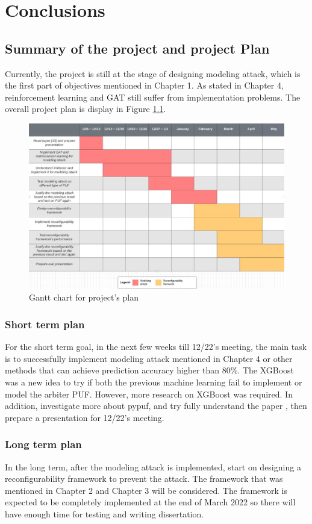 \chapter{Conclusions}

\section{Summary of the project and project Plan}
Currently, the project is still at the stage of designing modeling attack, which is the first part of objectives mentioned in Chapter 1. As stated in Chapter 4, 
reinforcement learning and GAT still suffer from implementation problems. The overall project plan is display in Figure \ref{fig:figure13}.
\begin{figure}[htp]
    \centering
    \includegraphics[width=18cm]{figures/figure13.jpg}
    \caption{Gantt chart for project's plan}
    \label{fig:figure13}
    \end{figure}

\subsection{Short term plan}
For the short term goal, in the next few weeks till 12/22's meeting,
the main task is to successfully implement modeling attack mentioned in Chapter 4 or other methods that can achieve prediction accuracy higher than 80\%. The XGBoost was a new idea to try if both the previous machine learning fail to implement or model the arbiter PUF. 
However, more research on XGBoost was required. In addition, investigate more about pypuf, and try fully understand the paper \cite{Reference11}, then prepare a presentation for 12/22's meeting.

\subsection{Long term plan}
In the long term, after the modeling attack is implemented, start on designing a reconfigurability framework to prevent the attack. The framework that was mentioned in Chapter 2 and Chapter 3 will be considered. The framework
is expected to be completely implemented at the end of March 2022 so there will have enough time for testing and writing dissertation.
